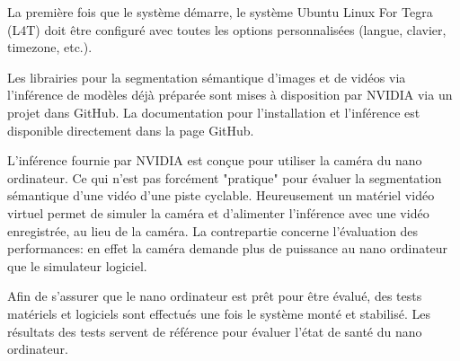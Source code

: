 \par La première fois que le système démarre, le système Ubuntu Linux For Tegra (L4T) doit être configuré avec toutes les options personnalisées (langue, clavier, timezone, etc.).
\par Les librairies pour la segmentation sémantique 
d'images et de vidéos via l'inférence de modèles déjà préparée sont mises à disposition par NVIDIA via un projet dans GitHub. La documentation pour l'installation et l'inférence est disponible directement dans la page GitHub. 
\par L'inférence fournie par NVIDIA est conçue pour utiliser la caméra du nano ordinateur. Ce qui n'est pas forcément "pratique" pour évaluer la segmentation sémantique d'une vidéo d'une piste cyclable. Heureusement un matériel vidéo virtuel permet de simuler la caméra et d'alimenter l'inférence avec une vidéo enregistrée, au lieu de la caméra. La contrepartie concerne l'évaluation des performances:  en effet la caméra demande plus de puissance au nano ordinateur que le simulateur logiciel.
\par Afin de s'assurer que le nano ordinateur est prêt pour être évalué, des tests matériels et logiciels sont  effectués une fois le système monté et stabilisé. Les résultats des tests servent de référence pour évaluer l'état de santé du nano ordinateur. 